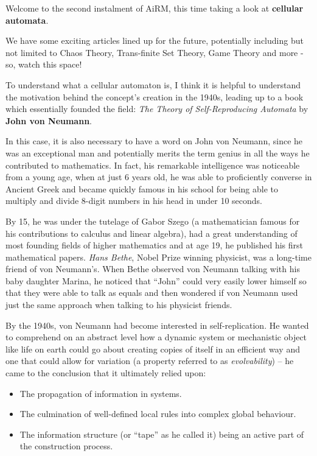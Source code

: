 Welcome to the second instalment of AiRM, this time taking a look at
\textbf{cellular automata}.

We have some exciting articles lined up for the future, potentially
including but not limited to Chaos Theory, Trans-finite Set Theory, Game
Theory and more - so, watch this space!

To understand what a cellular automaton is, I think it is helpful to
understand the motivation behind the concept's creation in the 1940s,
leading up to a book which essentially founded the field: \emph{The
Theory of Self-Reproducing Automata} by \textbf{John von Neumann}.

In this case, it is also necessary to have a word on John von Neumann,
since he was an exceptional man and potentially merits the term genius
in all the ways he contributed to mathematics. In fact, his remarkable
intelligence was noticeable from a young age, when at just 6 years old,
he was able to proficiently converse in Ancient Greek and became quickly
famous in his school for being able to multiply and divide 8-digit
numbers in his head in under 10 seconds.

By 15, he was under the tutelage of Gabor Szego (a mathematician famous
for his contributions to calculus and linear algebra), had a great
understanding of most founding fields of higher mathematics and at age
19, he published his first mathematical papers. \emph{Hans Bethe}, Nobel
Prize winning physicist, was a long-time friend of von Neumann's. When
Bethe observed von Neumann talking with his baby daughter Marina, he
noticed that ``John'' could very easily lower himself so that they were
able to talk as equals and then wondered if von Neumann used just the
same approach when talking to his physicist friends.

By the 1940s, von Neumann had become interested in self-replication. He
wanted to comprehend on an abstract level how a dynamic system or
mechanistic object like life on earth could go about creating copies of
itself in an efficient way and one that could allow for variation (a
property referred to as \emph{evolvability}) -- he came to the
conclusion that it ultimately relied upon:

\begin{itemize}
\item
  The propagation of information in systems.
\item
  The culmination of well-defined local rules into complex global
  behaviour.
\item
  The information structure (or ``tape'' as he called it) being an
  active part of the construction process.
\end{itemize}


